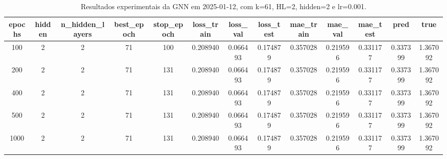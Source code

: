 \begin{table}[h]
\centering
\caption{Resultados experimentais da GNN em 2025-01-12, com k=61, HL=2, hidden=2 e lr=0.001.}
\label{tab:gnn_results_k61_hl2_h2_d20250112}
\begin{tabular}{ccccccccccccc}
\toprule
epochs & hidden & n\_hidden\_layers & best\_epoch & stop\_epoch & loss\_train & loss\_val & loss\_test & mae\_train & mae\_val & mae\_test & pred & true \\
\midrule
100 & 2 & 2 & 71 & 100 & 0.208940 & 0.066493 & 0.174879 & 0.357028 & 0.219596 & 0.331177 & 0.337399 & 1.367092 \\
200 & 2 & 2 & 71 & 131 & 0.208940 & 0.066493 & 0.174879 & 0.357028 & 0.219596 & 0.331177 & 0.337399 & 1.367092 \\
400 & 2 & 2 & 71 & 131 & 0.208940 & 0.066493 & 0.174879 & 0.357028 & 0.219596 & 0.331177 & 0.337399 & 1.367092 \\
500 & 2 & 2 & 71 & 131 & 0.208940 & 0.066493 & 0.174879 & 0.357028 & 0.219596 & 0.331177 & 0.337399 & 1.367092 \\
1000 & 2 & 2 & 71 & 131 & 0.208940 & 0.066493 & 0.174879 & 0.357028 & 0.219596 & 0.331177 & 0.337399 & 1.367092 \\
\bottomrule
\end{tabular}
\end{table}
